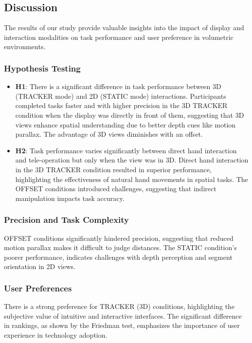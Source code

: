 \subsection{Discussion}

The results of our study provide valuable insights into the impact of display and interaction modalities on task performance and user preference in volumetric environments.

\subsubsection{Hypothesis Testing}
\begin{itemize}
	\item \textbf{H1}: There is a significant difference in task performance between 3D (TRACKER mode) and 2D (STATIC mode) interactions. Participants completed tasks faster and with higher precision in the 3D TRACKER condition when the display was directly in front of them, suggesting that 3D views enhance spatial understanding due to better depth cues like motion parallax. The advantage of 3D views diminishes with an offset.\\
	\item \textbf{H2}: Task performance varies significantly between direct hand interaction and tele-operation but only when the view was in 3D. Direct hand interaction in the 3D TRACKER condition resulted in superior performance, highlighting the effectiveness of natural hand movements in spatial tasks. The OFFSET conditions introduced challenges, suggesting that indirect manipulation impacts task accuracy.
\end{itemize}

\subsubsection{Precision and Task Complexity}
OFFSET conditions significantly hindered precision, suggesting that reduced motion parallax makes it difficult to judge distances. The STATIC condition's poorer performance, indicates challenges with depth perception and segment orientation in 2D views. 

\subsubsection{User Preferences}
There is a strong preference for TRACKER (3D) conditions, highlighting the subjective value of intuitive and interactive interfaces. The significant difference in rankings, as shown by the Friedman test, emphasizes the importance of user experience in technology adoption.

